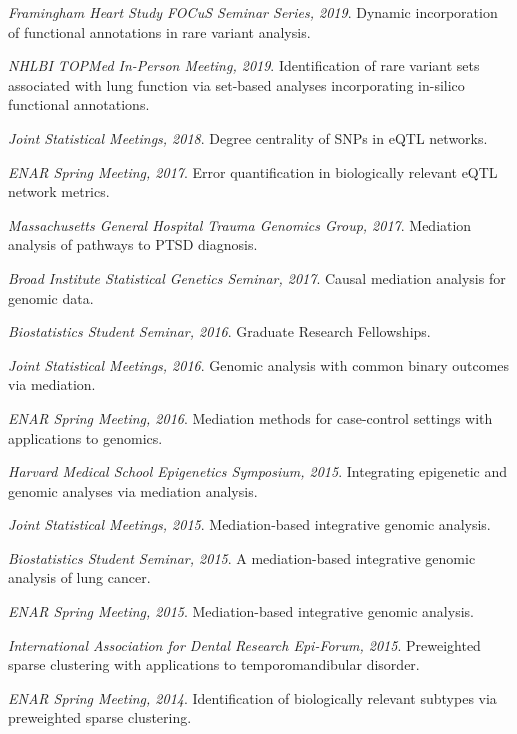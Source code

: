 
\vspace{-6mm}
\begin{cventries}

  \cventry
    {} %
    {} %
    {} %
    {} %
    {
      \begin{cvitems} %
\item \textit{Framingham Heart Study FOCuS Seminar Series, 2019}. Dynamic incorporation of functional annotations in rare variant analysis.
\item \textit{NHLBI TOPMed In-Person Meeting, 2019}. Identification of rare variant sets associated with lung function via set-based analyses incorporating in-silico functional annotations.
\item \textit{Joint Statistical Meetings, 2018}. Degree centrality of SNPs in eQTL networks.
\item \textit{ENAR Spring Meeting, 2017}. Error quantification in biologically relevant eQTL network metrics.
\item \textit{Massachusetts General Hospital Trauma Genomics Group, 2017}. Mediation analysis of pathways to PTSD diagnosis.
\item \textit{Broad Institute Statistical Genetics Seminar, 2017}. Causal mediation analysis for genomic data.
\item \textit{Biostatistics Student Seminar, 2016}. Graduate Research Fellowships.
\item \textit{Joint Statistical Meetings, 2016}. Genomic analysis with common binary outcomes via mediation.
\item \textit{ENAR Spring Meeting, 2016}. Mediation methods for case-control settings with applications to genomics.
\item \textit{Harvard Medical School Epigenetics Symposium, 2015}. Integrating epigenetic and genomic analyses via mediation analysis.
\item \textit{Joint Statistical Meetings, 2015}. Mediation-based integrative genomic analysis.
\item \textit{Biostatistics Student Seminar, 2015}. A mediation-based integrative genomic analysis of lung cancer.
\item \textit{ENAR Spring Meeting, 2015}. Mediation-based integrative genomic analysis.
\item \textit{International Association for Dental Research Epi-Forum, 2015}. Preweighted sparse clustering with applications to temporomandibular disorder.
\item \textit{ENAR Spring Meeting, 2014}. Identification of biologically relevant subtypes via preweighted sparse clustering.
      \end{cvitems}
    }
\end{cventries}

